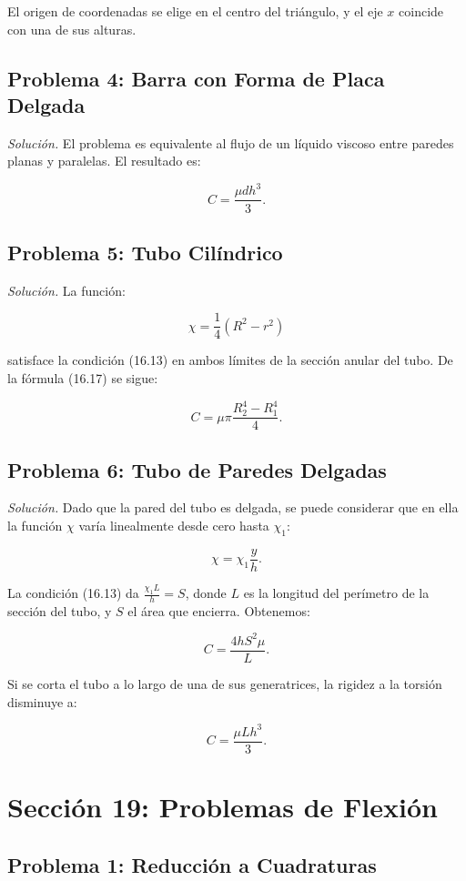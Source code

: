 \documentclass{article}
\begin{document}
El origen de coordenadas se elige en el centro del triángulo, y el eje $x$ coincide con una de sus alturas.

\subsection*{Problema 4: Barra con Forma de Placa Delgada}

\textit{Solución.} El problema es equivalente al flujo de un líquido viscoso entre paredes planas y paralelas. El resultado es:

$$
C = \frac{\mu dh^3}{3}.
$$

\subsection*{Problema 5: Tubo Cilíndrico}

\textit{Solución.} La función:

$$
\chi = \frac{1}{4}(R^2 - r^2)
$$

satisface la condición (16.13) en ambos límites de la sección anular del tubo. De la fórmula (16.17) se sigue:

$$
C = \mu \pi \frac{R_2^4 - R_1^4}{4}.
$$

\subsection*{Problema 6: Tubo de Paredes Delgadas}

\textit{Solución.} Dado que la pared del tubo es delgada, se puede considerar que en ella la función $\chi$ varía linealmente desde cero hasta $\chi_1$:

$$
\chi = \chi_1 \frac{y}{h}.
$$

La condición (16.13) da $\frac{\chi_1 L}{h} = S$, donde $L$ es la longitud del perímetro de la sección del tubo, y $S$ el área que encierra. Obtenemos:

$$
C = \frac{4hS^2 \mu}{L}.
$$

Si se corta el tubo a lo largo de una de sus generatrices, la rigidez a la torsión disminuye a:

$$
C = \frac{\mu Lh^3}{3}.
$$

\section*{Sección 19: Problemas de Flexión}

\subsection*{Problema 1: Reducción a Cuadraturas}
\end{document}
